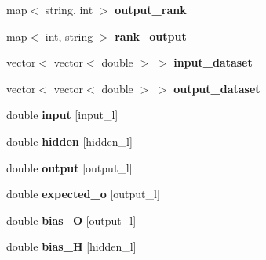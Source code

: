 \begin{DoxyCompactItemize}
\item 
\hypertarget{classNeural__Network_af46a9de8ef619f93fb8c0231be79163c}{map$<$ string, int $>$ {\bfseries output\-\_\-rank}}\label{classNeural__Network_af46a9de8ef619f93fb8c0231be79163c}

\item 
\hypertarget{classNeural__Network_a8e34531b701290d16068e3685f3066a4}{map$<$ int, string $>$ {\bfseries rank\-\_\-output}}\label{classNeural__Network_a8e34531b701290d16068e3685f3066a4}

\item 
\hypertarget{classNeural__Network_a81bab51b36643c5b10ba25d518c27ff3}{vector$<$ vector$<$ double $>$ $>$ {\bfseries input\-\_\-dataset}}\label{classNeural__Network_a81bab51b36643c5b10ba25d518c27ff3}

\item 
\hypertarget{classNeural__Network_aa8441449f55f07c3da384d81608373b5}{vector$<$ vector$<$ double $>$ $>$ {\bfseries output\-\_\-dataset}}\label{classNeural__Network_aa8441449f55f07c3da384d81608373b5}

\item 
\hypertarget{classNeural__Network_a347a1fceb1ac048ecd913a89126cebb3}{double {\bfseries input} \mbox{[}input\-\_\-l\mbox{]}}\label{classNeural__Network_a347a1fceb1ac048ecd913a89126cebb3}

\item 
\hypertarget{classNeural__Network_a5b31deacdc5c63e687d6ebc086b761ab}{double {\bfseries hidden} \mbox{[}hidden\-\_\-l\mbox{]}}\label{classNeural__Network_a5b31deacdc5c63e687d6ebc086b761ab}

\item 
\hypertarget{classNeural__Network_abe5631cce6141b7756154a5a9d247da2}{double {\bfseries output} \mbox{[}output\-\_\-l\mbox{]}}\label{classNeural__Network_abe5631cce6141b7756154a5a9d247da2}

\item 
\hypertarget{classNeural__Network_a8d632cf69d2fcd076e473aba1ae74702}{double {\bfseries expected\-\_\-o} \mbox{[}output\-\_\-l\mbox{]}}\label{classNeural__Network_a8d632cf69d2fcd076e473aba1ae74702}

\item 
\hypertarget{classNeural__Network_a8f26363ac0ccda6f04df35e68164cd3a}{double {\bfseries bias\-\_\-\-O} \mbox{[}output\-\_\-l\mbox{]}}\label{classNeural__Network_a8f26363ac0ccda6f04df35e68164cd3a}

\item 
\hypertarget{classNeural__Network_a38808438a02d406a7ab54c8bf825752a}{double {\bfseries bias\-\_\-\-H} \mbox{[}hidden\-\_\-l\mbox{]}}\label{classNeural__Network_a38808438a02d406a7ab54c8bf825752a}


\end{DoxyCompactItemize}
